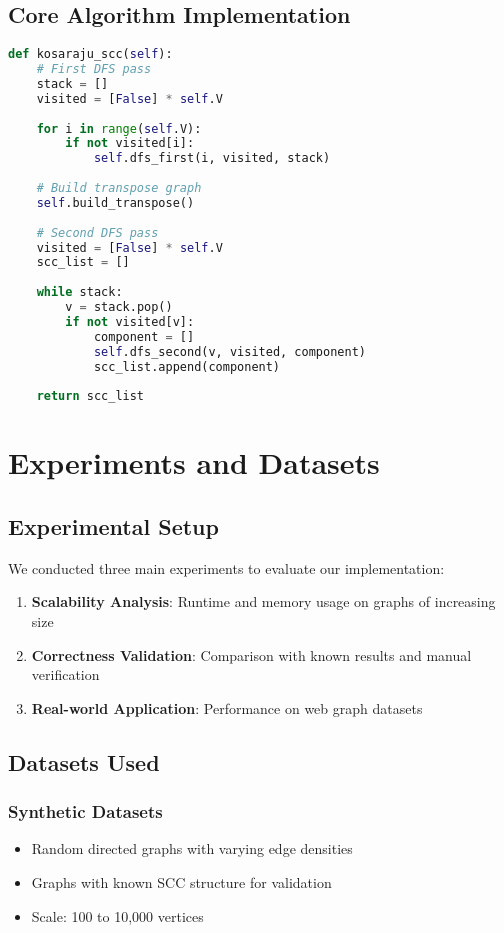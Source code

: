 \documentclass[12pt]{article}
\begin{document}
\subsection{Core Algorithm Implementation}

\begin{lstlisting}[language=Python, caption=Kosaraju's Algorithm Implementation]
def kosaraju_scc(self):
    # First DFS pass
    stack = []
    visited = [False] * self.V
    
    for i in range(self.V):
        if not visited[i]:
            self.dfs_first(i, visited, stack)
    
    # Build transpose graph
    self.build_transpose()
    
    # Second DFS pass
    visited = [False] * self.V
    scc_list = []
    
    while stack:
        v = stack.pop()
        if not visited[v]:
            component = []
            self.dfs_second(v, visited, component)
            scc_list.append(component)
    
    return scc_list
\end{lstlisting}

\section{Experiments and Datasets}
\subsection{Experimental Setup}

We conducted three main experiments to evaluate our implementation:

\begin{enumerate}
    \item \textbf{Scalability Analysis}: Runtime and memory usage on graphs of increasing size
    \item \textbf{Correctness Validation}: Comparison with known results and manual verification
    \item \textbf{Real-world Application}: Performance on web graph datasets
\end{enumerate}

\subsection{Datasets Used}

\subsubsection{Synthetic Datasets}
\begin{itemize}
    \item Random directed graphs with varying edge densities
    \item Graphs with known SCC structure for validation
    \item Scale: 100 to 10,000 vertices
\end{itemize}
\end{document}

